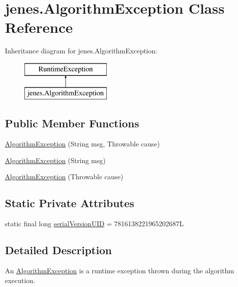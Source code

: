 \hypertarget{classjenes_1_1_algorithm_exception}{\section{jenes.\-Algorithm\-Exception Class Reference}
\label{classjenes_1_1_algorithm_exception}
}
Inheritance diagram for jenes.\-Algorithm\-Exception\-:\begin{figure}[H]
\begin{center}
\leavevmode
\includegraphics[height=2.000000cm]{classjenes_1_1_algorithm_exception}
\end{center}
\end{figure}
\subsection*{Public Member Functions}
\begin{DoxyCompactItemize}
\item 
\hyperlink{classjenes_1_1_algorithm_exception_aa53d271c0db7099eb6fc52c288e05eb0}{Algorithm\-Exception} (String msg, Throwable cause)
\item 
\hyperlink{classjenes_1_1_algorithm_exception_a295c243603f7b36f9ab5b0e1ec22aa60}{Algorithm\-Exception} (String msg)
\item 
\hyperlink{classjenes_1_1_algorithm_exception_ad6906756121d65db53ece1c1d9d8d0db}{Algorithm\-Exception} (Throwable cause)
\end{DoxyCompactItemize}
\subsection*{Static Private Attributes}
\begin{DoxyCompactItemize}
\item 
static final long \hyperlink{classjenes_1_1_algorithm_exception_abe743e6e185fba1c5072155434af5ab3}{serial\-Version\-U\-I\-D} = 7816138221965202687\-L
\end{DoxyCompactItemize}


\subsection{Detailed Description}
An {\ttfamily \hyperlink{classjenes_1_1_algorithm_exception}{Algorithm\-Exception}} is a runtime exception thrown during the algorithm execution.

